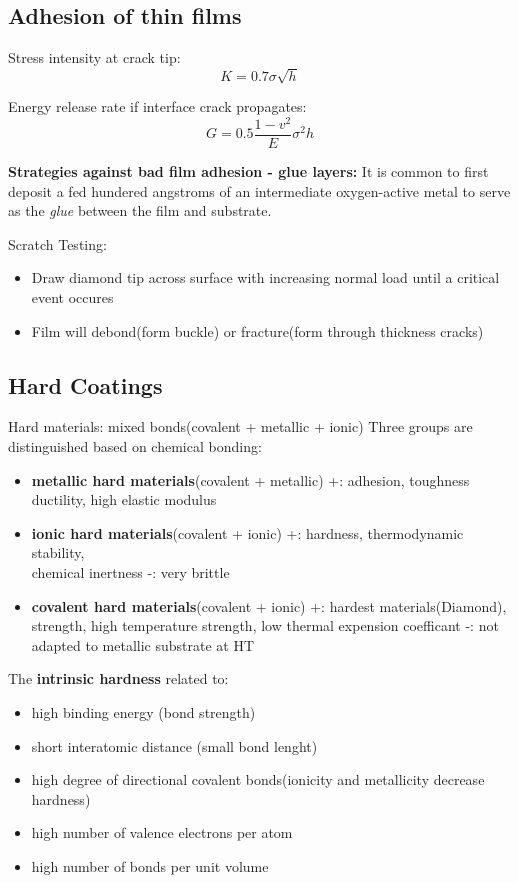\subsection{Adhesion of thin films}

Stress intensity at crack tip:
\[
K = 0.7 \sigma\sqrt{h}
\]

Energy release rate if interface crack propagates:
\[
G = 0.5 \frac{1-v^2}{E}\sigma^2 h
\]

\textbf{Strategies against bad film adhesion - glue layers:} It is common to first deposit a fed hundered angstroms of an intermediate oxygen-active metal to serve as the \textit{glue} between the film and substrate.

Scratch Testing:
\begin{itemize}
    \item Draw diamond tip across surface with increasing normal load until a critical event occures
    \item Film will debond(form buckle) or fracture(form through thickness cracks)
\end{itemize}

\subsection{Hard Coatings}
Hard materials: mixed bonds(covalent + metallic + ionic)
Three groups are distinguished based on chemical bonding:
\begin{itemize}
    \item \textbf{metallic hard materials}(covalent + metallic)
    \subitem +: adhesion, toughness ductility, high elastic modulus
    \item \textbf{ionic hard materials}(covalent + ionic)
    \subitem +: hardness, thermodynamic stability, \\chemical inertness
    \subitem -: very brittle
    \item \textbf{covalent hard materials}(covalent + ionic)
    \subitem +: hardest materials(Diamond), strength, high temperature strength, low thermal expension coefficant
    \subitem -: not adapted to metallic substrate at HT
\end{itemize}

The \textbf{intrinsic hardness }related to:
\begin{itemize}
    \item high binding energy (bond strength)
    \item short interatomic distance (small bond lenght)
    \item high degree of directional covalent bonds(ionicity and metallicity decrease hardness)
    \item high number of valence electrons per atom
    \item high number of bonds per unit volume
\end{itemize}

